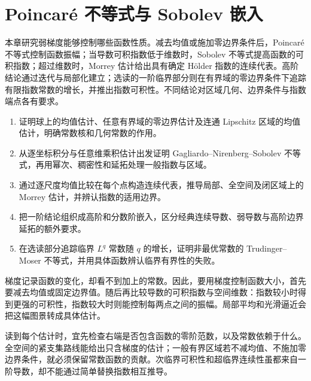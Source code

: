 \chapter{Poincaré 不等式与 Sobolev 嵌入}
\label{b1:ch:24}
\begin{chapterabstract}
本章研究弱梯度能够控制哪些函数性质。减去均值或施加零边界条件后，Poincaré 不等式控制函数振幅；当导数可积指数低于维数时，Sobolev 不等式提高函数的可积指数；超过维数时，Morrey 估计给出具有确定 Hölder 指数的连续代表。高阶结论通过迭代与局部化建立；选读的一阶临界部分则在有界域的零边界条件下追踪有限指数常数的增长，并推出指数可积性。不同结论对区域几何、边界条件与指数端点各有要求。
\end{chapterabstract}

\begin{learninggoals}
\begin{enumerate}
\item\label{b1:goal:24-poincare}证明球上的均值估计、任意有界域的零边界估计及连通 Lipschitz 区域的均值估计，明确常数核和几何常数的作用。
\item\label{b1:goal:24-sobolev}从逐坐标积分与任意维乘积估计出发证明 Gagliardo--Nirenberg--Sobolev 不等式，再用幂次、稠密性和延拓处理一般指数与区域。
\item\label{b1:goal:24-morrey}通过逐尺度均值比较在每个点构造连续代表，推导局部、全空间及闭区域上的 Morrey 估计，并辨认指数的适用边界。
\item\label{b1:goal:24-higher}把一阶结论组织成高阶和分数阶嵌入，区分经典连续导数、弱导数与高阶边界延拓的额外要求。
\item\label{b1:goal:24-critical}在选读部分追踪临界 \(L^q\) 常数随 \(q\) 的增长，证明非最优常数的 Trudinger--Moser 不等式，并用具体函数辨认临界有界性的失败。
\end{enumerate}
\end{learninggoals}

梯度记录函数的变化，却看不到加上的常数。因此，要用梯度控制函数大小，首先要减去均值或固定边界值。随后再比较导数的可积指数与空间维数：指数较小时得到更强的可积性，指数较大时则能控制每两点之间的振幅。局部平均和光滑逼近会把这幅图景转成具体估计。

\ProseParagraphBreak

读到每个估计时，宜先检查右端是否包含函数的零阶范数，以及常数依赖于什么。全空间的紧支集路线能给出只含梯度的估计；一般有界区域若不减均值、不施加零边界条件，就必须保留常数函数的贡献。次临界可积性和超临界连续性虽都来自一阶导数，却不能通过简单替换指数相互推导。

